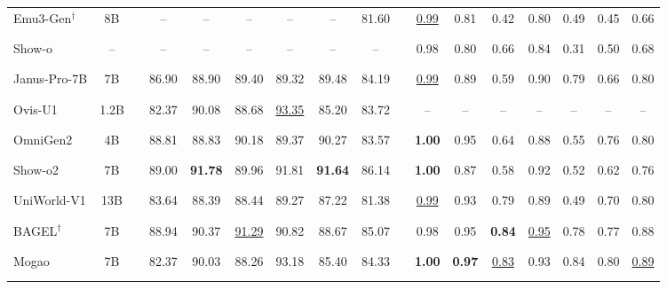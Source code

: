 \documentclass{llmxive}
\providecommand{\metricssep}{\rule[-0.35em]{0.35pt}{1.55em}}
\begin{document}
\begin{table}[!t]
{\begin{tabular}{@{}l c c c c c c c c c c c c c c c c@{}}

Emu3-Gen$^\dagger$ \cite{wang2024emu3}
& 8B
& \metricssep
& -- & -- & -- & -- & -- & 81.60
& \metricssep
& \underline{0.99} & 0.81 & 0.42 & 0.80 & 0.49 & 0.45 & 0.66 \\

Show-o \cite{xie2024show}
& --
& \metricssep
& -- & -- & -- & -- & -- & --
& \metricssep
& 0.98 & 0.80 & 0.66 & 0.84 & 0.31 & 0.50 & 0.68 \\

Janus-Pro-7B \cite{chen2025janus}
& 7B
& \metricssep
& 86.90 & 88.90 & 89.40 & 89.32 & 89.48 & 84.19
& \metricssep
& \underline{0.99} & 0.89 & 0.59 & 0.90 & 0.79 & 0.66 & 0.80 \\


Ovis-U1 \cite{wang2025ovis}
& 1.2B
& \metricssep
& 82.37 & 90.08 & 88.68 & \underline{93.35} & 85.20 & 83.72
& \metricssep
& -- & -- & -- & -- & -- & -- & -- \\

OmniGen2 \cite{wu2025omnigen2}
& 4B
& \metricssep
& 88.81 & 88.83 & 90.18 & 89.37 & 90.27 & 83.57
& \metricssep
& \textbf{1.00} & 0.95 & 0.64 & 0.88 & 0.55 & 0.76 & 0.80 \\

Show-o2 \cite{xie2025show}
& 7B
& \metricssep
& 89.00 & \textbf{91.78} & 89.96 & 91.81 & \textbf{91.64} & 86.14
& \metricssep
& \textbf{1.00} & 0.87 & 0.58 & 0.92 & 0.52 & 0.62 & 0.76 \\

UniWorld-V1 \cite{lin2025uniworld}
& 13B
& \metricssep
& 83.64 & 88.39 & 88.44 & 89.27 & 87.22 & 81.38
& \metricssep
& \underline{0.99} & 0.93 & 0.79 & 0.89 & 0.49 & 0.70 & 0.80 \\

BAGEL$^\dagger$ \cite{deng2025emerging}
& 7B
& \metricssep
& 88.94 & 90.37 & \underline{91.29} & 90.82 & 88.67 & 85.07
& \metricssep
& 0.98 & 0.95 & \textbf{0.84} & \underline{0.95} & 0.78 & 0.77 & 0.88 \\

Mogao \cite{liao2025mogao}
& 7B
& \metricssep
& 82.37 & 90.03 & 88.26 & 93.18 & 85.40 & 84.33
& \metricssep
& \textbf{1.00} & \textbf{0.97} & \underline{0.83} & 0.93 & 0.84 & 0.80 & \underline{0.89} \\


\end{tabular}}
\end{table}
\end{document}

